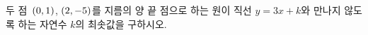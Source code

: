 두 점~$(0{,}\mkern3mu\mathopen{}1)$, $(2{,}\mkern3mu\mathopen{}-5)$를 지름의 양 끝 점으로 하는 원이 직선 $y=3x+k$와 만나지 않도록 하는 자연수 $k$의 최솟값을 구하시오.
